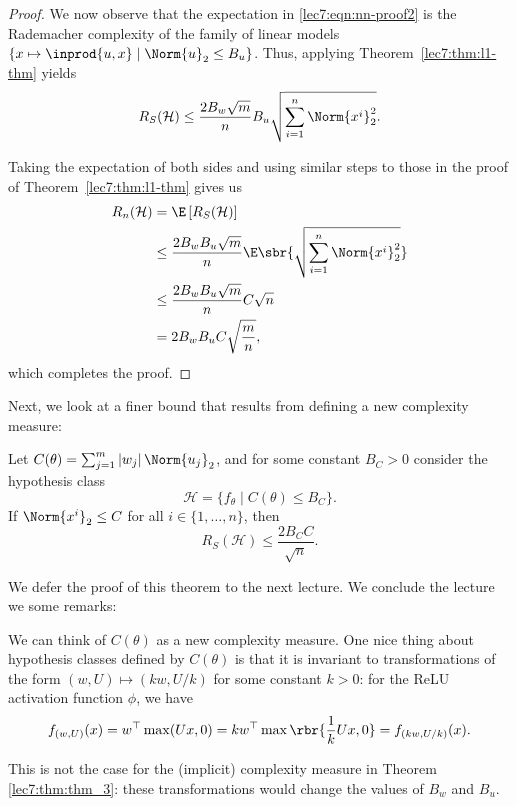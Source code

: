 \begin{proof}
    We now observe that the expectation in \eqref{lec7:eqn:nn-proof2} is the Rademacher complexity of the family of linear models $\{x \mapsto \inprod{u,x} \mid \Norm{u}_2\leq B_u\}$. Thus, applying Theorem~\ref{lec7:thm:l1-thm} yields
    \begin{equation}
        R_S(\mathcal{H}) \leq \frac{2B_w\sqrt{m}}{n}B_u\sqrt{\sum_{i=1}^n \Norm{x\sp{i}}_2^2}.
    \end{equation}
    
    Taking the expectation of both sides and using similar steps to those in the proof of Theorem~\ref{lec7:thm:l1-thm} gives us
    \begin{align}
        R_n(\mathcal{H})  &= \E\left[ R_S(\mathcal{H})\right] \\
        &\leq \frac{2B_wB_u\sqrt{m}}{n} \E\sbr{\sqrt{\sum_{i=1}^n \Norm{x\sp{i}}_2^2}} \\
        &\leq \frac{2B_wB_u\sqrt{m}}{n} C\sqrt{n} \\
        &= 2 B_w B_u C\sqrt{\frac{m}{n}},
    \end{align}
    which completes the proof.
    
\end{proof}

Next, we look at a finer bound that results from defining a new complexity measure:

\begin{theorem}
    Let $C(\theta) = \sum_{j=1}^m |w_j|\,\Norm{u_j}_2$, and for some constant $B_C > 0$ consider the hypothesis class
    \begin{equation}
        \mathcal{H}=\{f_\theta \mid C(\theta) \leq B_C\}.
    \end{equation}
    If $\Norm{x\sp{i}}_2\leq C$ for all $i\in\{1,\dots,n\}$, then
    \begin{equation}
        R_S(\mathcal{H}) \leq \frac{2B_C C}{\sqrt{n}}.
    \end{equation}
\end{theorem}
We defer the proof of this theorem to the next lecture. We conclude the lecture we some remarks:

\begin{remark}
We can think of $C(\theta)$ as a new complexity measure. One nice thing about hypothesis classes defined by $C(\theta)$ is that it is invariant to transformations of the form $(w, U) \mapsto (kw, U /k)$ for some constant $k > 0$: for the ReLU activation function $\phi$, we have
\begin{equation}
    f_{(w, U)}(x) 
    = w^\top \max(Ux, 0) 
    = kw^\top \max\rbr{\frac{1}{k}Ux, 0}
    = f_{(kw, U/k)}(x).
\end{equation}

This is not the case for the (implicit) complexity measure in Theorem \ref{lec7:thm:thm_3}: these transformations would change the values of $B_w$ and $B_u$.
\end{remark}


